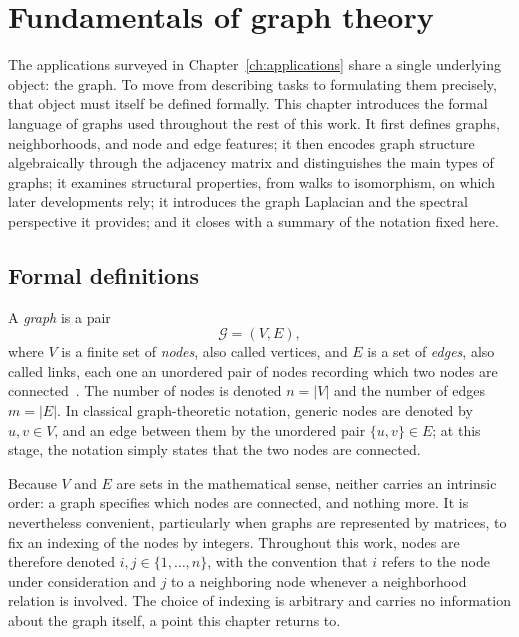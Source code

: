 \chapter{Fundamentals of graph theory}
\label{ch:graph-theory}
\minitoc

The applications surveyed in Chapter~\ref{ch:applications} share a single
underlying object: the graph. To move from describing tasks to formulating
them precisely, that object must itself be defined formally. This
chapter introduces the formal language of graphs used throughout the rest of
this work. It first defines graphs, neighborhoods, and node and edge features;
it then encodes graph structure algebraically through the adjacency
matrix and distinguishes the main types of graphs; it examines structural
properties, from walks to isomorphism, on which later developments rely; it
introduces the graph Laplacian and the spectral perspective it provides; and
it closes with a summary of the notation fixed here.

\section{Formal definitions}
\label{sec:formal-definitions}

A \textit{graph} is a pair
\begin{equation}
  \mathcal{G} = (V, E),
  \label{eq:graph-definition}
\end{equation}
where $V$ is a finite set of \textit{nodes}, also called vertices, and $E$
is a set of \textit{edges}, also called links, each one an unordered pair of
nodes recording which two nodes are connected~\cite{diestel2017}. The number
of nodes is denoted $n = \lvert V \rvert$ and the number of edges
$m = \lvert E \rvert$. In classical graph-theoretic notation, generic nodes
are denoted by $u, v \in V$, and an edge between them by the unordered pair
$\{u, v\} \in E$; at this stage, the notation simply states that the two
nodes are connected.

Because $V$ and $E$ are sets in the mathematical sense, neither carries an
intrinsic order: a graph specifies which nodes are connected, and nothing
more. It is nevertheless convenient, particularly when graphs are
represented by matrices, to fix an indexing of the nodes by integers.
Throughout this work, nodes are therefore denoted
$i, j \in \{1, \ldots, n\}$, with the convention that $i$ refers to the node
under consideration and $j$ to a neighboring node whenever a neighborhood
relation is involved. The choice of indexing is arbitrary and carries no
information about the graph itself, a point this chapter returns to.

